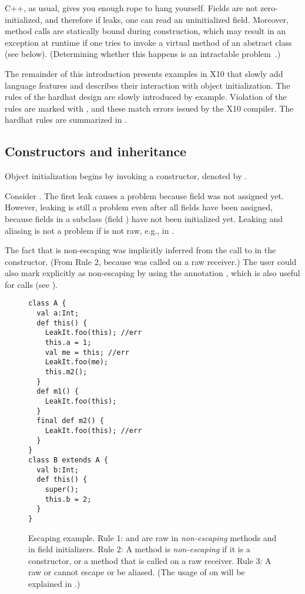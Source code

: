 \mbox{C++}, as usual, gives you enough rope to hang yourself.
Fields are not zero-initialized, and therefore if \this leaks,
    one can read an uninitialized field.
Moreover, method calls are statically bound during construction,
    which may result in an exception at runtime
    if one tries to invoke a virtual method of an abstract class (see  below).
(Determining whether this happens is an intractable problem~\cite{Gil:1998:CTA:646155.679689}.)


The remainder of this introduction presents examples in X10
    that slowly add language features and describes their interaction with
    object initialization.
The rules of the hardhat design are slowly introduced by example.
Violation of the rules are marked with ,
    and these match errors issued by the X10 compiler.
The hardhat rules are summarized in .

\subsection{Constructors and inheritance}
Object initialization begins by invoking a constructor, denoted by .

Consider .
The first leak causes a problem because field  was not assigned yet.
However, leaking is still a problem even after all fields have been assigned,
    because fields in a subclass (field ) have not been initialized yet.
Leaking and aliasing is not a problem if \this is not raw, e.g., in .

The fact that  is non-escaping was implicitly inferred from the call to 
    in the constructor.
(From Rule 2, because  was called on a raw \this receiver.)
The user could also mark  explicitly as non-escaping by using the annotation
    ,
    which is also useful for  calls (see ).

\begin{figure}
\begin{lstlisting}
class A {
  val a:Int;
  def this() {
    LeakIt.foo(this); //err
    this.a = 1;
    val me = this; //err
    LeakIt.foo(me);
    this.m2();
  }
  def m1() {
    LeakIt.foo(this);
  }
  final def m2() {
    LeakIt.foo(this); //err
  }
}
class B extends A {
  val b:Int;
  def this() {
    super();
    this.b = 2;
  }
}
\end{lstlisting}
\caption{Escaping \this example.
    Rule 1: \this and  are raw in \emph{non-escaping} methods and in field initializers.
    Rule 2: A method is \emph{non-escaping} if it is a constructor,
            or a method that is called on a raw \this receiver.
    Rule 3: A raw \this or  cannot escape or be aliased.
    (The usage of  on  will be explained in .)}
\label{Figure:Escaping-this}
\end{figure}




